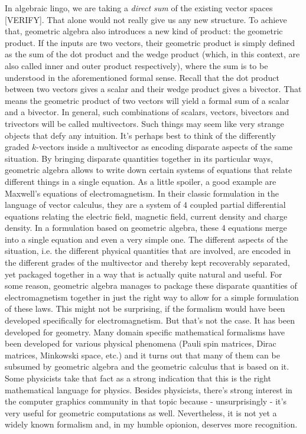 In algebraic lingo, we are taking a \emph{direct sum} of the existing vector spaces [VERIFY]. That alone would not really give us any new structure. To achieve that, geometric algebra also introduces a new kind of product: the geometric product. If the inputs are two vectors, their geometric product is simply defined as the sum of the dot product and the wedge product (which, in this context, are also called inner and outer product respectively), where the sum is to be understood in the aforementioned formal sense. Recall that the dot product between two vectors gives a scalar and their wedge product gives a bivector. That means the geometric product of two vectors will yield a formal sum of a scalar and a bivector. In general, such combinations of scalars, vectors, bivectors and trivectors will be called multivectors. Such things may seem like very strange objects that defy any intuition. It's perhaps best to think of the differently graded $k$-vectors inside a multivector as encoding disparate aspects of the same situation. By bringing disparate quantities together in its particular ways, geometric algebra allows to write down certain systems of equations that relate different things in a single equation. As a little spoiler, a good example are Maxwell's equations of electromagnetism. In their classic formulation in the language of vector calculus, they are a system of 4 coupled partial differential equations relating the electric field, magnetic field, current density and charge density. In a formulation based on geometric algebra, these 4 equations merge into a single equation and even a very simple one. The different aspects of the situation, i.e. the different physical quantities that are involved, are encoded in the different grades of the multivector and thereby kept recoverably separated, yet packaged together in a way that is actually quite natural and useful. For some reason, geometric algebra manages to package these disparate quantities of electromagnetism together in just the right way to allow for a simple formulation of these laws. This might not be surprising, if the formalism would have been developed specifically for electromagnetism. But that's not the case. It has been developed for geometry. Many domain specific mathematical formalisms have been developed for various physical phenomena (Pauli spin matrices, Dirac matrices, Minkowski space, etc.) and it turns out that many of them can be subsumed by geometric algebra and the geometric calculus that is based on it. Some physicists take that fact as a strong indication that this is the right mathematical language for physics. Besides physicists, there's strong interest in the computer graphics community in that topic because - unsurprisingly - it's very useful for geometric computations as well. Nevertheless, it is not yet a widely known formalism and, in my humble opionion, deserves more recognition.


